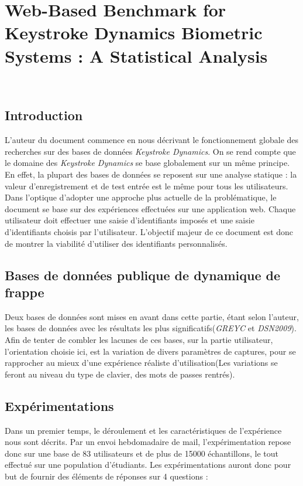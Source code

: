 \section{Web-Based Benchmark for Keystroke Dynamics Biometric Systems : A Statistical Analysis\cite{giotWeb}}

\\

\subsection{Introduction}

L'auteur du document commence en nous décrivant le fonctionnement globale des recherches sur des bases de données \textit{Keystroke Dynamics}.
On se rend compte que le domaine des \textit{Keystroke Dynamics} se base globalement sur un même principe. En effet, la plupart des bases de données se reposent sur une analyse statique : la valeur d'enregistrement et de test entrée est le même pour tous les utilisateurs.\\

Dans l'optique d'adopter une approche plus actuelle de la problématique, le document se base sur des expériences effectuées sur une application web. Chaque utilisateur doit effectuer une saisie d'identifiants imposés et une saisie d'identifiants choisis par l'utilisateur. L'objectif majeur de ce document est donc de montrer la viabilité d'utiliser des identifiants personnalisés.

\subsection{Bases de données publique de dynamique de frappe}
 
Deux bases de données sont mises en avant dans cette partie, étant selon l'auteur, les bases de données avec les résultats les plus significatifs(\textit{GREYC} et \textit{DSN2009}). Afin de tenter de combler les lacunes de ces bases, sur la partie utilisateur, l'orientation choisie ici, est la variation de divers paramètres de captures, pour se rapprocher au mieux d'une expérience réaliste d'utilisation(Les variations se feront au niveau du type de clavier, des mots de passes rentrés).

\subsection{Expérimentations}

Dans un premier temps, le déroulement et les caractéristiques de l'expérience nous sont décrits. Par un envoi hebdomadaire de mail, l'expérimentation repose donc sur une base de 83 utilisateurs  et de plus de 15000 échantillons, le tout effectué sur une population d'étudiants. Les expérimentations auront donc pour but de fournir des éléments de réponses sur 4 questions :\\

